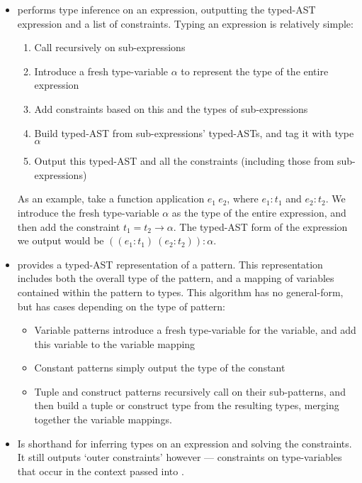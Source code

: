 \begin{itemize}
\item {} performs type inference on an expression, outputting the typed-AST expression and a list of constraints. Typing an expression is relatively simple:
\begin{enumerate}
\item Call  recursively on sub-expressions
\item Introduce a fresh type-variable $\alpha$ to represent the type of the entire expression
\item Add constraints based on this and the types of sub-expressions
\item Build typed-AST from sub-expressions' typed-ASTs, and tag it with type $\alpha$
\item Output this typed-AST and all the constraints (including those from sub-expressions)
\end{enumerate}
As an example, take a function application $e_1\ e_2$, where $e_1 : t_1$ and $e_2 : t_2$. We introduce the fresh type-variable $\alpha$ as the type of the entire expression, and then add the constraint $t_1 = t_2 \rightarrow \alpha$. The typed-AST form of the expression we output would be $((e_1 : t_1)\ (e_2 : t_2)) : \alpha$.

\item {} provides a typed-AST representation of a pattern. This representation includes both the overall type of the pattern, and a mapping of variables contained within the pattern to types. This algorithm has no general-form, but has cases depending on the type of pattern:
\begin{itemize}
\item Variable patterns introduce a fresh type-variable for the variable, and add this variable to the variable mapping
\item Constant patterns simply output the type of the constant
\item Tuple and construct patterns recursively call  on their sub-patterns, and then build a tuple or construct type from the resulting types, merging together the variable mappings.
\end{itemize}

\item {} Is shorthand for inferring types on an expression and solving the constraints. It still outputs `outer constraints' however --- constraints on type-variables that occur in the context passed into .


\end{itemize}
